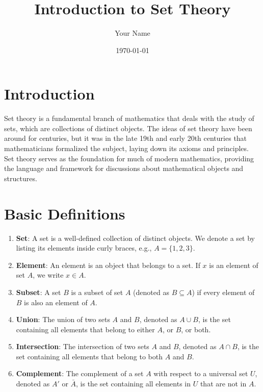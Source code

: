 \documentclass{article}
\title{Introduction to Set Theory}
\author{Your Name}
\date{\today}
\begin{document}
\maketitle

\section{Introduction}

Set theory is a fundamental branch of mathematics that deals with the study of sets, which are collections of distinct objects. The ideas of set theory have been around for centuries, but it was in the late 19th and early 20th centuries that mathematicians formalized the subject, laying down its axioms and principles. Set theory serves as the foundation for much of modern mathematics, providing the language and framework for discussions about mathematical objects and structures.

\section{Basic Definitions}

\begin{enumerate}[label=(\alph*)]
    \item \textbf{Set}: A set is a well-defined collection of distinct objects. We denote a set by listing its elements inside curly braces, e.g., $A = \{1, 2, 3\}$.
    
    \item \textbf{Element}: An element is an object that belongs to a set. If $x$ is an element of set $A$, we write $x \in A$.
    
    \item \textbf{Subset}: A set $B$ is a subset of set $A$ (denoted as $B \subseteq A$) if every element of $B$ is also an element of $A$.
    
    \item \textbf{Union}: The union of two sets $A$ and $B$, denoted as $A \cup B$, is the set containing all elements that belong to either $A$, or $B$, or both.
    
    \item \textbf{Intersection}: The intersection of two sets $A$ and $B$, denoted as $A \cap B$, is the set containing all elements that belong to both $A$ and $B$.
    
    \item \textbf{Complement}: The complement of a set $A$ with respect to a universal set $U$, denoted as $A'$ or $\bar{A}$, is the set containing all elements in $U$ that are not in $A$.
\end{enumerate}
\end{document}
